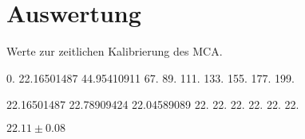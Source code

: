 \section{Auswertung}
\label{sec:Auswertung}


\begin{table}
  \caption{Werte zur zeitlichen Kalibrierung des MCA.}
  \label{tab:Kalibrierung}

\end{table}
0.
22.16501487
44.95410911
67.
89.
111.
133.
155.
177.
199.

22.16501487 22.78909424 22.04589089 22.         22.         22.
 22.         22.         22.

 $22.11 \pm 0.08$



